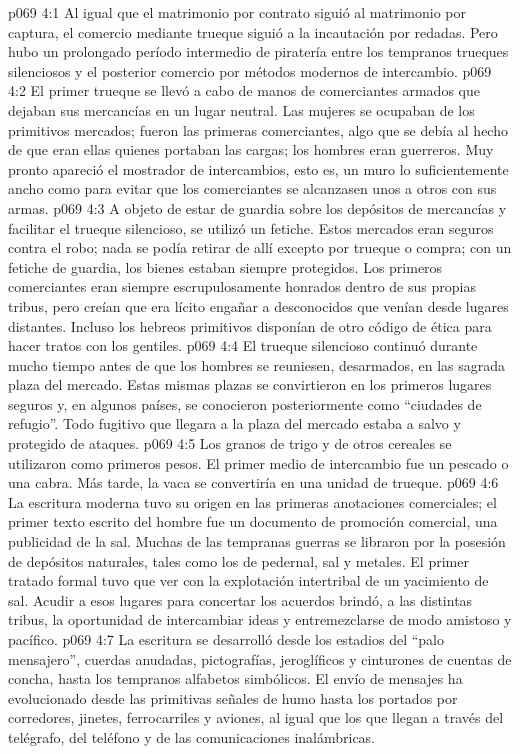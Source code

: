 \vs p069 4:1 Al igual que el matrimonio por contrato siguió al matrimonio por captura, el comercio mediante trueque siguió a la incautación por redadas. Pero hubo un prolongado período intermedio de piratería entre los tempranos trueques silenciosos y el posterior comercio por métodos modernos de intercambio.
\vs p069 4:2 El primer trueque se llevó a cabo de manos de comerciantes armados que dejaban sus mercancías en un lugar neutral. Las mujeres se ocupaban de los primitivos mercados; fueron las primeras comerciantes, algo que se debía al hecho de que eran ellas quienes portaban las cargas; los hombres eran guerreros. Muy pronto apareció el mostrador de intercambios, esto es, un muro lo suficientemente ancho como para evitar que los comerciantes se alcanzasen unos a otros con sus armas.
\vs p069 4:3 A objeto de estar de guardia sobre los depósitos de mercancías y facilitar el trueque silencioso, se utilizó un fetiche. Estos mercados eran seguros contra el robo; nada se podía retirar de allí excepto por trueque o compra; con un fetiche de guardia, los bienes estaban siempre protegidos. Los primeros comerciantes eran siempre escrupulosamente honrados dentro de sus propias tribus, pero creían que era lícito engañar a desconocidos que venían desde lugares distantes. Incluso los hebreos primitivos disponían de otro código de ética para hacer tratos con los gentiles.
\vs p069 4:4 El trueque silencioso continuó durante mucho tiempo antes de que los hombres se reuniesen, desarmados, en las sagrada plaza del mercado. Estas mismas plazas se convirtieron en los primeros lugares seguros y, en algunos países, se conocieron posteriormente como “ciudades de refugio”. Todo fugitivo que llegara a la plaza del mercado estaba a salvo y protegido de ataques.
\vs p069 4:5 \pc Los granos de trigo y de otros cereales se utilizaron como primeros pesos. El primer medio de intercambio fue un pescado o una cabra. Más tarde, la vaca se convertiría en una unidad de trueque.
\vs p069 4:6 La escritura moderna tuvo su origen en las primeras anotaciones comerciales; el primer texto escrito del hombre fue un documento de promoción comercial, una publicidad de la sal. Muchas de las tempranas guerras se libraron por la posesión de depósitos naturales, tales como los de pedernal, sal y metales. El primer tratado formal tuvo que ver con la explotación intertribal de un yacimiento de sal. Acudir a esos lugares para concertar los acuerdos brindó, a las distintas tribus, la oportunidad de intercambiar ideas y entremezclarse de modo amistoso y pacífico.
\vs p069 4:7 La escritura se desarrolló desde los estadios del “palo mensajero”, cuerdas anudadas, pictografías, jeroglíficos y cinturones de cuentas de concha, hasta los tempranos alfabetos simbólicos. El envío de mensajes ha evolucionado desde las primitivas señales de humo hasta los portados por corredores, jinetes, ferrocarriles y aviones, al igual que los que llegan a través del telégrafo, del teléfono y de las comunicaciones inalámbricas.
